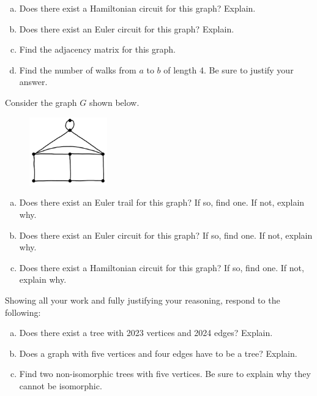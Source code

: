 \documentclass[11pt,letterpaper]{article}
\begin{document}
\begin{enumerate}[(a)]
\item Does there exist a Hamiltonian circuit for this graph? Explain. 
\item Does there exist an Euler circuit for this graph? Explain. 
\item Find the adjacency matrix for this graph.
\item Find the number of walks from $a$ to $b$ of length 4. Be sure to justify your answer. 
\end{enumerate}



\newpage



 Consider the graph $G$ shown below.
	\begin{figure}[h]
	\centering
	\includegraphics[width=0.3\textwidth]{graph3.jpg}
	\end{figure}

\begin{enumerate}[(a)]
\item Does there exist an Euler trail for this graph? If so, find one. If not, explain why.
\item Does there exist an Euler circuit for this graph? If so, find one. If not, explain why. 
\item Does there exist a Hamiltonian circuit for this graph? If so, find one. If not, explain why. 
\end{enumerate}



\newpage



 Showing all your work and fully justifying your reasoning, respond to the following:
	\begin{enumerate}[(a)]
	\item Does there exist a tree with 2023 vertices and 2024 edges? Explain. 
	\item Does a graph with five vertices and four edges have to be a tree? Explain.
	\item Find two non-isomorphic trees with five vertices. Be sure to explain why they cannot be isomorphic. 
	\end{enumerate}
\end{document}
